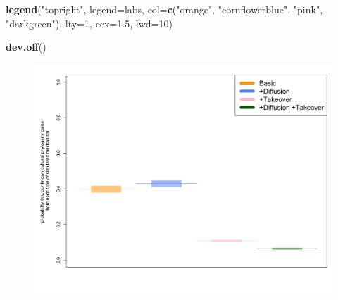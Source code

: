 \documentclass[]{book}
\newenvironment{Shaded}{\begin{snugshade}}{\end{snugshade}}
\newcommand{\KeywordTok}[1]{\textcolor[rgb]{0.13,0.29,0.53}{\textbf{{#1}}}}
\newcommand{\DataTypeTok}[1]{\textcolor[rgb]{0.13,0.29,0.53}{{#1}}}
\newcommand{\DecValTok}[1]{\textcolor[rgb]{0.00,0.00,0.81}{{#1}}}
\newcommand{\FloatTok}[1]{\textcolor[rgb]{0.00,0.00,0.81}{{#1}}}
\newcommand{\StringTok}[1]{\textcolor[rgb]{0.31,0.60,0.02}{{#1}}}
\newcommand{\NormalTok}[1]{{#1}}
\theoremstyle{definition}
\theoremstyle{definition}
\theoremstyle{definition}
\theoremstyle{remark}
\begin{document}
\begin{Shaded}
\begin{Highlighting}[]
\KeywordTok{legend}\NormalTok{(}\StringTok{"topright"}\NormalTok{, }\DataTypeTok{legend=}\NormalTok{labs, }\DataTypeTok{col=}\KeywordTok{c}\NormalTok{(}\StringTok{"orange"}\NormalTok{, }\StringTok{"cornflowerblue"}\NormalTok{, }\StringTok{"pink"}\NormalTok{, }\StringTok{"darkgreen"}\NormalTok{), }\DataTypeTok{lty=}\DecValTok{1}\NormalTok{, }\DataTypeTok{cex=}\FloatTok{1.5}\NormalTok{, }\DataTypeTok{lwd=}\DecValTok{10}\NormalTok{)}

\KeywordTok{dev.off}\NormalTok{()}
\end{Highlighting}
\end{Shaded}

\begin{figure}
\centering
\includegraphics{last_step_predictions.png}
\caption{}
\end{figure}
\end{document}
